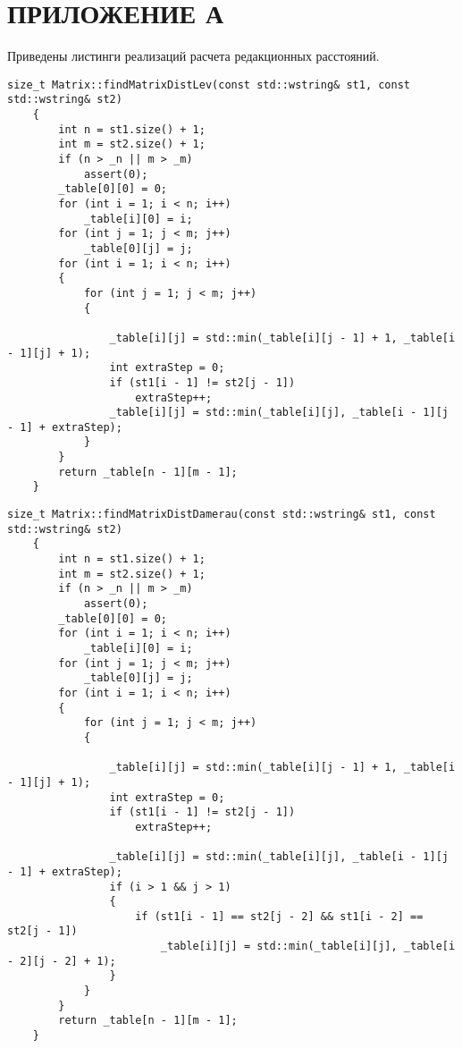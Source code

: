 \chapter*{\hfill \centering ПРИЛОЖЕНИЕ А\hfill}
Приведены листинги реализаций расчета редакционных расстояний.

\begin{lstlisting}[label=lst:lev_matr,caption=Метод нахождения расстояния Левенштейна с использованием матрицы]
    size_t Matrix::findMatrixDistLev(const std::wstring& st1, const std::wstring& st2)
    {
        int n = st1.size() + 1;
        int m = st2.size() + 1;
        if (n > _n || m > _m)
            assert(0);
        _table[0][0] = 0;
        for (int i = 1; i < n; i++)
            _table[i][0] = i;
        for (int j = 1; j < m; j++)
            _table[0][j] = j;
        for (int i = 1; i < n; i++)
        {
            for (int j = 1; j < m; j++)
            {
    
                _table[i][j] = std::min(_table[i][j - 1] + 1, _table[i - 1][j] + 1);
                int extraStep = 0;
                if (st1[i - 1] != st2[j - 1])
                    extraStep++;
                _table[i][j] = std::min(_table[i][j], _table[i - 1][j - 1] + extraStep);
            }
        }
        return _table[n - 1][m - 1];
    }
\end{lstlisting}

\begin{lstlisting}[label=lst:damer_matr,caption=Метод нахождения расстояния Дамерау---Левенштейна с использованием матрицы]
    size_t Matrix::findMatrixDistDamerau(const std::wstring& st1, const std::wstring& st2)
    {
        int n = st1.size() + 1;
        int m = st2.size() + 1;
        if (n > _n || m > _m)
            assert(0);
        _table[0][0] = 0;
        for (int i = 1; i < n; i++)
            _table[i][0] = i;
        for (int j = 1; j < m; j++)
            _table[0][j] = j;
        for (int i = 1; i < n; i++)
        {
            for (int j = 1; j < m; j++)
            {
    
                _table[i][j] = std::min(_table[i][j - 1] + 1, _table[i - 1][j] + 1);
                int extraStep = 0;
                if (st1[i - 1] != st2[j - 1])
                    extraStep++;
    
                _table[i][j] = std::min(_table[i][j], _table[i - 1][j - 1] + extraStep);
                if (i > 1 && j > 1)
                {
                    if (st1[i - 1] == st2[j - 2] && st1[i - 2] == st2[j - 1])
                        _table[i][j] = std::min(_table[i][j], _table[i - 2][j - 2] + 1);
                }
            }
        }
        return _table[n - 1][m - 1];
    }
\end{lstlisting}

